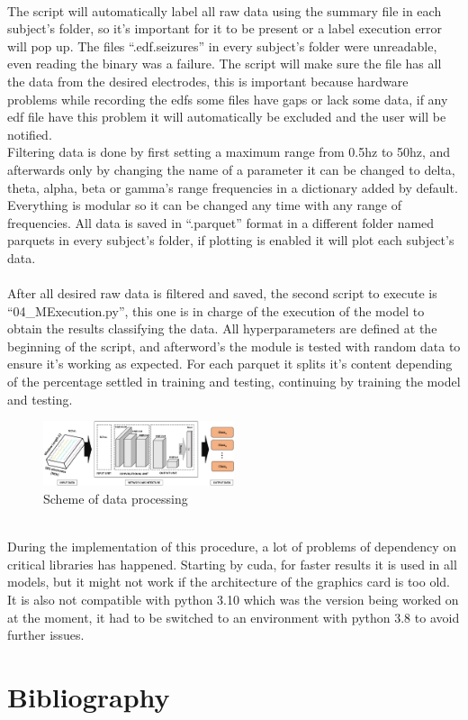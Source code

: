 ﻿\documentclass[10pt,a4paper,twocolumn,twoside]{article}
\begin{document}
\leavevmode\\
The script will automatically label all raw data using the summary file in each subject’s folder, so it’s important for it to be present or a label execution error will pop up. The files “.edf.seizures” in every subject’s folder were unreadable, even reading the binary was a failure. The script will make sure the file has all the data from the desired electrodes, this is important because hardware problems while recording the edfs some files have gaps or lack some data, if any edf file have this problem it will automatically be excluded and the user will be notified.
\\
Filtering data is done by first setting a maximum range from 0.5hz to 50hz, and afterwards only by changing the name of a parameter it can be changed to delta, theta, alpha, beta or gamma’s range frequencies in a dictionary added by default. Everything is modular so it can be changed any time with any range of frequencies. All data is saved in “.parquet” format in a different folder named parquets in every subject’s folder, if plotting is enabled it will plot each subject’s data.
\\
\\
After all desired raw data is filtered and saved, the second script to execute is “04\_MExecution.py”, this one is in charge of the execution of the model to obtain the results classifying the data. All hyperparameters are defined at the beginning of the script, and afterword’s the module is tested with random data to ensure it’s working as expected. For each parquet it splits it’s content depending of the percentage settled in training and testing, continuing by training the model and testing.
\\

\begin{figure}[h]
  \caption{Scheme of data processing }
  \centering
  \includegraphics[width=0.5\textwidth]{img/FeatureProjectorModel.png}
\end{figure}
\leavevmode\\
During the implementation of this procedure, a lot of problems of dependency on critical libraries has happened. Starting by cuda, for faster results it is used in all models, but it might not work if the architecture of the graphics card is too old. It is also not compatible with python 3.10 which was the version being worked on at the moment, it had to be switched to an environment with python 3.8 to avoid further issues.
\\



\section{Bibliography}
\label{sec-bibliography}

\printbibliography

\end{document}
